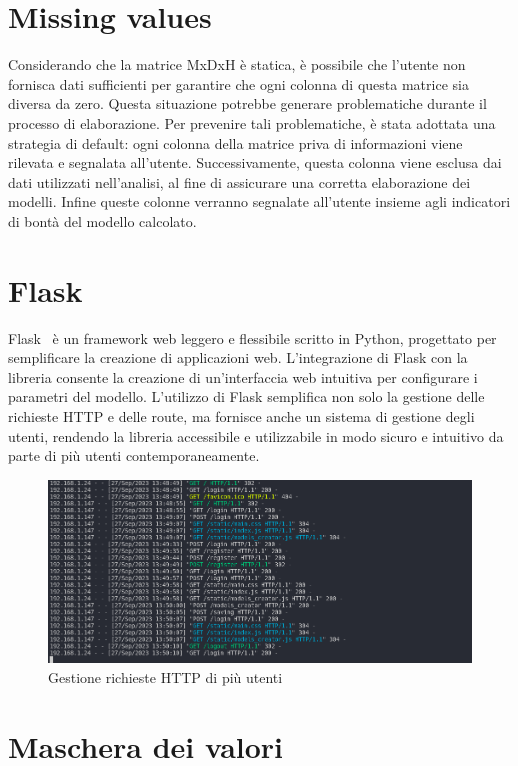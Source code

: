 \documentclass{rapportECL}
\begin{document}
\section{Missing values}

Considerando che la matrice MxDxH è statica, è possibile che l'utente non fornisca dati sufficienti per garantire che ogni colonna di 
questa matrice sia diversa da zero. Questa situazione potrebbe generare problematiche durante il processo di elaborazione. 
Per prevenire tali problematiche, è stata adottata una strategia di default: ogni colonna della matrice priva di informazioni viene rilevata e segnalata 
all'utente. Successivamente, questa colonna viene esclusa dai dati utilizzati nell'analisi, al fine di assicurare una corretta elaborazione dei modelli.
Infine queste colonne verranno segnalate all'utente insieme agli indicatori di bontà del modello calcolato.

\section{Flask}
  Flask~\cite{flask} è un framework web leggero e flessibile scritto in Python, progettato per semplificare la creazione di applicazioni web. 
  L'integrazione di Flask con la libreria consente la creazione di un'interfaccia web intuitiva per configurare i parametri del modello. L'utilizzo di 
  Flask semplifica non solo la gestione delle richieste HTTP e delle route, ma fornisce anche un sistema di gestione degli utenti, rendendo la libreria 
  accessibile e utilizzabile in modo sicuro e intuitivo da parte di più utenti contemporaneamente.

  \begin{figure}[htp]
    \centering
    \includegraphics[width=1\textwidth]{images/img7.png}
    \caption{Gestione richieste HTTP di più utenti}
  \end{figure}
  
\section{Maschera dei valori}
\end{document}
